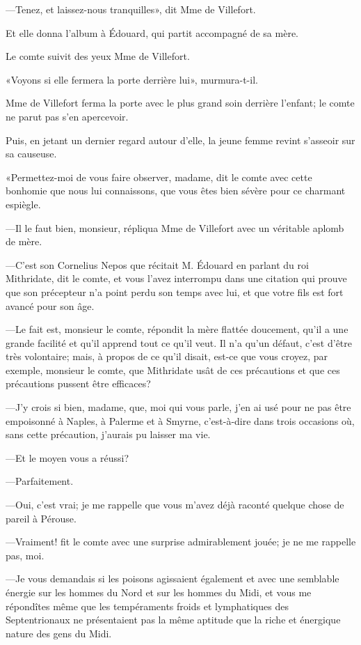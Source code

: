 —Tenez, et laissez-nous tranquilles», dit Mme de Villefort. 

Et elle donna l'album à Édouard, qui partit accompagné de sa mère. 

Le comte suivit des yeux Mme de Villefort. 

«Voyons si elle fermera la porte derrière lui», murmura-t-il. 

Mme de Villefort ferma la porte avec le plus grand soin derrière l'enfant; le comte ne parut pas s'en apercevoir. 

Puis, en jetant un dernier regard autour d'elle, la jeune femme revint s'asseoir sur sa causeuse. 

«Permettez-moi de vous faire observer, madame, dit le comte avec cette bonhomie que nous lui connaissons, que vous êtes bien sévère pour ce charmant espiègle. 

—Il le faut bien, monsieur, répliqua Mme de Villefort avec un véritable aplomb de mère. 

—C'est son Cornelius Nepos que récitait M. Édouard en parlant du roi Mithridate, dit le comte, et vous l'avez interrompu dans une citation qui prouve que son précepteur n'a point perdu son temps avec lui, et que votre fils est fort avancé pour son âge. 

—Le fait est, monsieur le comte, répondit la mère flattée doucement, qu'il a une grande facilité et qu'il apprend tout ce qu'il veut. Il n'a qu'un défaut, c'est d'être très volontaire; mais, à propos de ce qu'il disait, est-ce que vous croyez, par exemple, monsieur le comte, que Mithridate usât de ces précautions et que ces précautions pussent être efficaces? 

—J'y crois si bien, madame, que, moi qui vous parle, j'en ai usé pour ne pas être empoisonné à Naples, à Palerme et à Smyrne, c'est-à-dire dans trois occasions où, sans cette précaution, j'aurais pu laisser ma vie. 

—Et le moyen vous a réussi? 

—Parfaitement. 

—Oui, c'est vrai; je me rappelle que vous m'avez déjà raconté quelque chose de pareil à Pérouse. 

—Vraiment! fit le comte avec une surprise admirablement jouée; je ne me rappelle pas, moi. 

—Je vous demandais si les poisons agissaient également et avec une semblable énergie sur les hommes du Nord et sur les hommes du Midi, et vous me répondîtes même que les tempéraments froids et lymphatiques des Septentrionaux ne présentaient pas la même aptitude que la riche et énergique nature des gens du Midi. 

